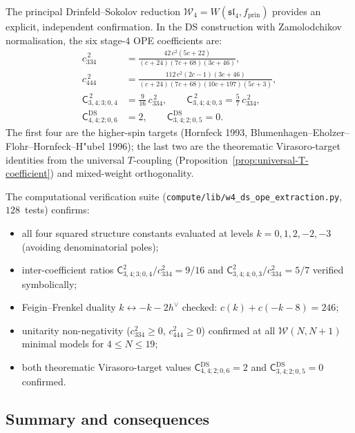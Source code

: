 \documentclass[11pt]{article}
\newcommand{\cW}{\mathcal{W}}
\newcommand{\fsl}{\mathfrak{sl}}
\begin{document}
The principal Drinfeld--Sokolov reduction $\cW_4 = W(\fsl_4, f_{\mathrm{prin}})$
provides an explicit, independent confirmation.  In the DS construction with
Zamolodchikov normalisation, the six stage-$4$ OPE coefficients are:
\begin{align*}
c_{334}^{\,2}
&= \frac{42\,c^2(5c+22)}{(c+24)(7c+68)(3c+46)},
\\[3pt]
c_{444}^{\,2}
&= \frac{112\,c^2(2c-1)(3c+46)}{(c+24)(7c+68)(10c+197)(5c+3)},
\\[3pt]
\mathsf{C}_{3,4;3;0,4}^{\,2}
&= \tfrac{9}{16}\,c_{334}^{\,2},
\qquad
\mathsf{C}_{3,4;4;0,3}^{\,2}
= \tfrac{5}{7}\,c_{334}^{\,2},
\\[3pt]
\mathsf{C}^{\mathrm{DS}}_{4,4;2;0,6}
&= 2,
\qquad
\mathsf{C}^{\mathrm{DS}}_{3,4;2;0,5}
= 0.
\end{align*}
The first four are the higher-spin targets (Hornfeck 1993,
Blumenhagen--Eholzer--Flohr--Hornfeck--H"ubel 1996); the last two are
the theorematic Virasoro-target identities from the universal $T$-coupling
(Proposition~\ref{prop:universal-T-coefficient}) and mixed-weight orthogonality.

The computational verification suite
(\texttt{compute/lib/w4\_ds\_ope\_extraction.py}, $128$~tests) confirms:
\begin{itemize}
\item all four squared structure constants evaluated at levels
  $k=0,1,2,-2,-3$ (avoiding denominatorial poles);
\item inter-coefficient ratios
  $\mathsf{C}_{3,4;3;0,4}^2/c_{334}^2 = 9/16$ and
  $\mathsf{C}_{3,4;4;0,3}^2/c_{334}^2 = 5/7$ verified symbolically;
\item Feigin--Frenkel duality $k\leftrightarrow -k-2h^\vee$ checked:
  $c(k)+c(-k-8)=246$;
\item unitarity non-negativity ($c_{334}^2\ge 0$, $c_{444}^2\ge 0$)
  confirmed at all $\cW(N,N{+}1)$ minimal models for $4\le N\le 19$;
\item both theorematic Virasoro-target values
  $\mathsf{C}^{\mathrm{DS}}_{4,4;2;0,6}=2$ and
  $\mathsf{C}^{\mathrm{DS}}_{3,4;2;0,5}=0$ confirmed.
\end{itemize}

\subsection{Summary and consequences}
\end{document}
